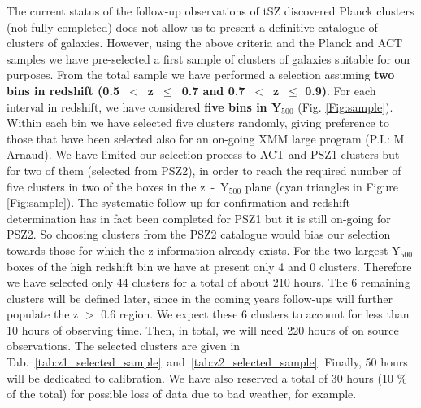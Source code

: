 \documentclass[11pt,a4paper,twoside,graphicx,color]{article}
\begin{document}
\vspace{0.3cm}  
The current status of the follow-up observations of tSZ discovered Planck clusters (not fully completed) does not allow us to present a definitive catalogue of clusters of galaxies. However, using the above criteria and the Planck and ACT samples we have pre-selected a first sample of clusters of galaxies suitable for our purposes. %
From the total sample we have performed a selection assuming {\bf two bins in redshift (0.5~$<$~z~$\le$~0.7 and 0.7~$<$~z~$\le$ 0.9)}.
For each interval in redshift, we have considered {\bf five bins in Y$_{500}$} (Fig. \ref{Fig:sample}). Within each bin we have selected five clusters randomly, giving preference to those that have been selected also for an on-going XMM large program (P.I.: M. Arnaud). We have limited our selection process to ACT and PSZ1 clusters but for two of them (selected from PSZ2), in order to reach the required number of five clusters in two of the boxes in the z~-~Y$_{500}$ plane (cyan triangles in Figure \ref{Fig:sample}). The systematic follow-up for confirmation and redshift determination has in fact been completed for PSZ1 but it is still on-going for PSZ2. So choosing clusters from the PSZ2 catalogue would bias our selection towards those for which the z information already exists. For the two largest Y$_{500}$ boxes of the high redshift bin we have at present only 4 and 0 clusters. Therefore we have selected only 44 clusters for a total of about 210 hours. The 6 remaining clusters will be defined later, since in the coming years follow-ups will further populate the z $>$ 0.6 region. We expect these 6 clusters to account for less than 10 hours of observing time. Then, in total, we will need 220 hours of on source observations. The selected clusters are given in Tab.~\ref{tab:z1_selected_sample}~and~\ref{tab:z2_selected_sample}. Finally, 50 hours will be dedicated to calibration. We have also reserved a total of 30 hours (10 \% of the total) for possible loss of data due to bad weather, for example.

\end{document}
